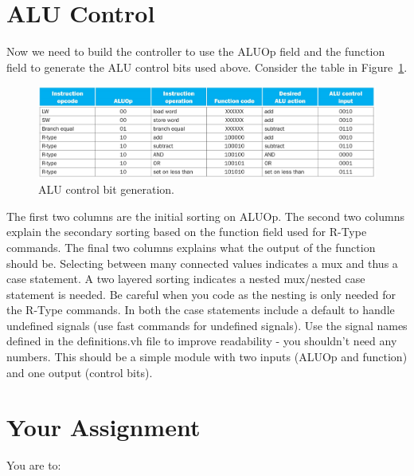 \section{ALU Control}

Now we need to build the controller to use the ALUOp field and the function field to generate the ALU control bits used above.  Consider the table in Figure~\ref{fig:alucontrolbits}.  
\begin{figure}
\caption{ALU control bit generation.}\label{fig:alucontrolbits}
\begin{center}
\includegraphics[width=\textwidth]{../images/ALUcontrolbits.png}
\end{center}
\end{figure}
The first two columns are the initial sorting on ALUOp.  The second two columns explain the secondary sorting based on the function field used for R-Type commands.  The final two columns explains what the output of the function should be.  Selecting between many connected values indicates a mux and thus a case statement.  A two layered sorting indicates a nested mux/nested case statement is needed.  Be careful when you code as the nesting is only needed for the R-Type commands.  In both the case statements include a default to handle undefined signals (use fast commands for undefined signals).  Use the signal names defined in the definitions.vh file to improve readability - you shouldn't need any numbers.  This should be a simple module with two inputs (ALUOp and function) and one output (control bits).

\section{Your Assignment}

You are to:
